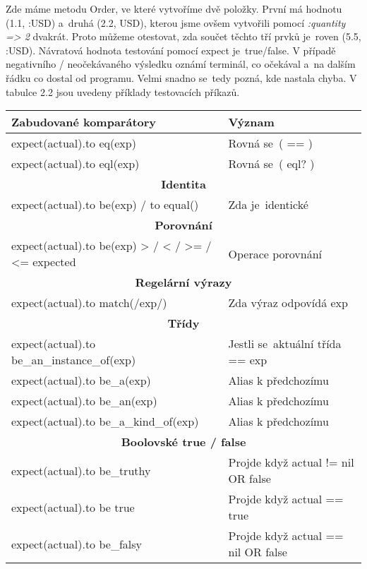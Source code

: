 \par Zde máme metodu Order, ve které vytvoříme dvě položky. První má hodnotu (1.1, :USD) a~druhá (2.2, USD), kterou jsme ovšem vytvořili pomocí \textit{:quantity => 2} dvakrát. Proto můžeme otestovat, zda součet těchto tří prvků je~roven (5.5, :USD). Návratová hodnota testování pomocí expect je~true/false. V případě negativního / neočekávaného výsledku oznámí terminál, co očekával a~na dalším řádku co dostal od programu. Velmi snadno se~tedy pozná, kde nastala chyba. V tabulce 2.2 jsou uvedeny příklady testovacích příkazů.

\begin{center}
\begin{longtable}{| m{} | m{} |} 
\hline
 \textbf{Zabudované komparátory} & \textbf{Význam} \\ 
 \hline
 expect(actual).to eq(exp) & Rovná se~( == ) \\
 \hline
 expect(actual).to eql(exp) & Rovná se~( eql? ) \\
 \hline
 \multicolumn{2}{||c||}{\textbf{Identita}}\\
 \hline
 expect(actual).to be(exp) / to equal() & Zda je~identické\\
 \hline
 \multicolumn{2}{||c||}{\textbf{Porovnání}}\\
 \hline
 expect(actual).to be(exp) > / < / >= / <= expected & Operace porovnání \\
 \hline
 \multicolumn{2}{||c||}{\textbf{Regelární výrazy}}\\
 \hline
 expect(actual).to match(/exp/) & Zda výraz odpovídá exp \\
 \hline
 \multicolumn{2}{||c||}{\textbf{Třídy}}\\
 \hline
 expect(actual).to be\_an\_instance\_of(exp) & Jestli se~aktuální třída == exp \\
 \hline
 expect(actual).to be\_a(exp) & Alias k předchozímu \\
 \hline
 expect(actual).to be\_an(exp) & Alias k předchozímu  \\
 \hline
 expect(actual).to be\_a\_kind\_of(exp) & Alias k předchozímu  \\
 \hline
 \multicolumn{2}{||c||}{\textbf{Boolovské true / false}}\\
 \hline
 expect(actual).to be\_truthy  & Projde když actual != nil OR false\\
 \hline
 expect(actual).to be true    & Projde když actual == true \\
 \hline
 expect(actual).to be\_falsy   & Projde když actual == nil OR false \\

\end{longtable}
\end{center}
